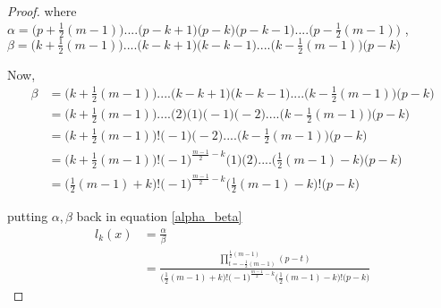 \documentclass[../document.tex]{subfiles}
\begin{document}
\begin{appendices}
\begin{proof}
			where 
			$\alpha = 
			\big(
			p + \frac{1}{2}(m-1)
			\big)
			....
			\big(
			p - k+1
			\big)
			\big(p-k\big)
			\big(
			p  - k-1
			\big)
			....
			\big(
			p  - \frac{1}{2}(m-1)
			\big)
			$
			, $\beta =   \big(
			k + \frac{1}{2}(m-1)
			\big)
			....
			\big(
			k - k + 1
			\big)
			\big(
			k  - k -1
			\big)
			....
			\big(
			k  - \frac{1}{2}(m-1)
			\big)
			\big(p-k\big)$
			
			Now,
			\begin{equation*}
				\begin{split}
					\beta   &= \big(
					k + \frac{1}{2}(m-1)
					\big)
					....
					\big(
					k - k + 1
					\big)
					\big(
					k  - k -1
					\big)
					....
					\big(
					k  - \frac{1}{2}(m-1)
					\big)
					\big(p-k\big)
					\\
					&= \big(
					k + \frac{1}{2}(m-1)
					\big)
					....
					\big(  2  \big)
					\big(  1  \big)
					\big( -1  \big)
					\big( -2  \big)
					....
					\big(
					k  - \frac{1}{2}(m-1)
					\big)
					\big(p-k\big)
					\\
					&= \Big( k + \frac{1}{2}(m-1) \Big)! 
					\big( -1  \big)
					\big( -2  \big)
					....
					\big(
					k  - \frac{1}{2}(m-1)
					\big)
					\big(p-k\big)
					\\
					&= \Big( k + \frac{1}{2}(m-1) \Big)! 
					\Big(  -1  \Big)^{\frac{m-1}{2}-k}    
					\big( 1  \big)
					\big( 2  \big)
					....
					\big(
					\frac{1}{2}(m-1) -k
					\big)
					\big(p-k\big)
					\\
					&= \Big( \frac{1}{2}(m-1) +k \Big)! 
					\Big(  -1  \Big)^{\frac{m-1}{2}-k}    
					\Big( \frac{1}{2}(m-1) -k \Big)! 
					\Big( p - k \Big)
				\end{split}
			\end{equation*}
			
			putting $\alpha , \beta$ back in equation \ref{alpha_beta}
			\begin{equation*}
				\begin{split}
					l_k(x) &= 
					\frac{ \alpha }{ \beta } 
					\\
					&=
					\frac{\prod_{t = -\frac{1}{2}(m-1) }^{\frac{1}{2}(m-1)}  (p-t)}{
						\Big( \frac{1}{2}(m-1) +k \Big)! 
						\Big(  -1  \Big)^{\frac{m-1}{2}-k}    
						\Big( \frac{1}{2}(m-1) -k \Big)! 
						\Big( p - k \Big)
					}
				\end{split}
			\end{equation*}
			

\end{proof}
\end{appendices}
\end{document}
